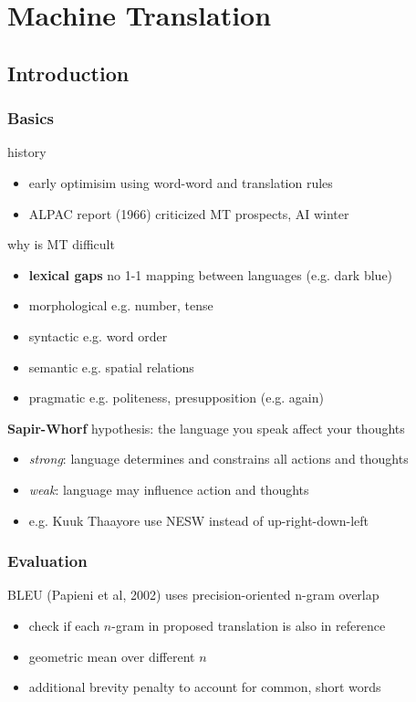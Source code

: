 \documentclass[]{article}
\theoremstyle{definition}
\begin{document}
\section{Machine Translation}%
\label{sec:machine_translation}

\subsection{Introduction}%
\label{sub:introduction}

\subsubsection{Basics}%
\label{ssub:basics}

history
\begin{itemize}
    \item early optimisim using word-word and translation rules
    \item ALPAC report (1966) criticized MT prospects, AI winter
\end{itemize}

why is MT difficult
\begin{itemize}
    \item \textbf{lexical gaps} no 1-1 mapping between languages (e.g. dark blue)
    \item morphological e.g. number, tense
    \item syntactic e.g. word order
    \item semantic e.g. spatial relations
    \item pragmatic e.g. politeness, presupposition (e.g. again)
\end{itemize}

\textbf{Sapir-Whorf} hypothesis: the language you speak affect your thoughts
\begin{itemize}
    \item \textit{strong}: language determines and constrains all actions and thoughts
    \item \textit{weak}: language may influence action and thoughts
    \item e.g. Kuuk Thaayore use NESW instead of up-right-down-left
\end{itemize}

\subsubsection{Evaluation}%
\label{ssub:evaluation}

BLEU (Papieni et al, 2002) uses precision-oriented n-gram overlap
\begin{itemize}
    \item check if each $n$-gram in proposed translation is also in reference
    \item geometric mean over different $n$
    \item additional brevity penalty to account for common, short words
\end{itemize}
\end{document}
